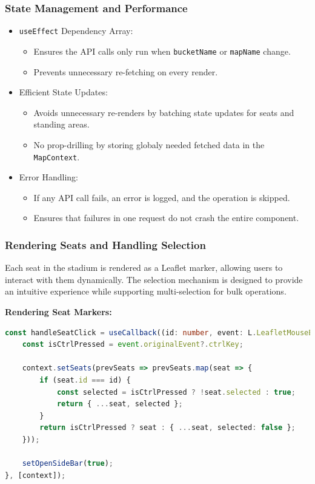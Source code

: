\subsubsection{State Management and Performance}
\begin{itemize}
    \item \texttt{useEffect} Dependency Array:
    \begin{itemize}
        \item Ensures the API calls only run when \texttt{bucketName} or \texttt{mapName} change.
        \item Prevents unnecessary re-fetching on every render.
    \end{itemize}
    
    \item Efficient State Updates:
    \begin{itemize}
        \item Avoids unnecessary re-renders by batching state updates for seats and standing areas.
        \item No prop-drilling by storing globaly needed fetched data in the \texttt{MapContext}.
    \end{itemize}

    \item Error Handling:
    \begin{itemize}
        \item If any API call fails, an error is logged, and the operation is skipped.
        \item Ensures that failures in one request do not crash the entire component.
    \end{itemize}
\end{itemize}

\subsubsection{Rendering Seats and Handling Selection}

Each seat in the stadium is rendered as a Leaflet marker, allowing users to interact with them dynamically. The selection mechanism is designed to provide an intuitive experience while supporting multi-selection for bulk operations.

\textbf{Rendering Seat Markers:}
\begin{lstlisting}[language=TypeScript, caption=Rendering and Selecting Seats, label=lst:seat-rendering]
const handleSeatClick = useCallback((id: number, event: L.LeafletMouseEvent) => {
    const isCtrlPressed = event.originalEvent?.ctrlKey;

    context.setSeats(prevSeats => prevSeats.map(seat => {
        if (seat.id === id) {
            const selected = isCtrlPressed ? !seat.selected : true;
            return { ...seat, selected };
        }
        return isCtrlPressed ? seat : { ...seat, selected: false };
    }));

    setOpenSideBar(true);
}, [context]);
\end{lstlisting}

